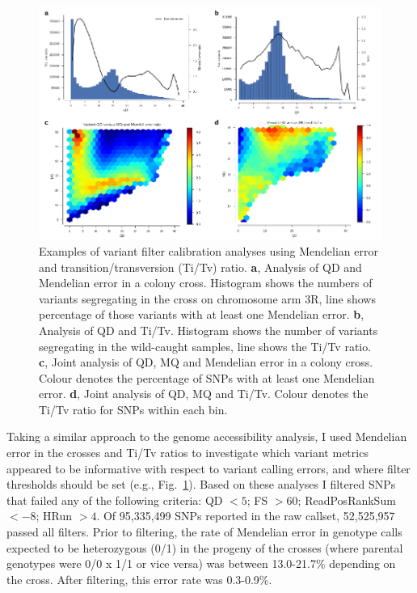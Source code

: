 \begin{refsection}
\begin{figure}[t!]
\centering
\includegraphics[width=1.1\textwidth,center]{artwork/chapter3/variant_filtering.pdf}
\caption{Examples of variant filter calibration analyses using Mendelian error and transition/transversion (Ti/Tv) ratio.
%
\textbf{a}, Analysis of QD and Mendelian error in a colony cross. Histogram shows the numbers of variants segregating in the cross on chromosome arm 3R, line shows percentage of those variants with at least one Mendelian error.
%
\textbf{b}, Analysis of QD and Ti/Tv. Histogram shows the number of variants segregating in the wild-caught samples, line shows the Ti/Tv ratio.
%
\textbf{c}, Joint analysis of QD, MQ and Mendelian error in a colony cross. Colour denotes the percentage of SNPs with at least one Mendelian error.
%
\textbf{d}, Joint analysis of QD, MQ and Ti/Tv. Colour denotes the Ti/Tv ratio for SNPs within each bin.
}
%
\label{fig:ch3-variant_filters}
\end{figure}


Taking a similar approach to the genome accessibility analysis, I used Mendelian error in the crosses and Ti/Tv ratios to investigate which variant metrics appeared to be informative with respect to variant calling errors, and where filter thresholds should be set (e.g., Fig.~\ref{fig:ch3-variant_filters}).
%
Based on these analyses I filtered SNPs that failed any of the following criteria: QD $< 5$; FS $> 60$; ReadPosRankSum $< -8$; HRun $> 4$.
%
Of 95,335,499 SNPs reported in the raw callset, 52,525,957 passed all filters.
%
Prior to filtering, the rate of Mendelian error in genotype calls expected to be heterozygous (0/1) in the progeny of the crosses (where parental genotypes were 0/0 x 1/1 or vice versa) was between 13.0-21.7\% depending on the cross.
%
After filtering, this error rate was 0.3-0.9\%.



\end{refsection}
